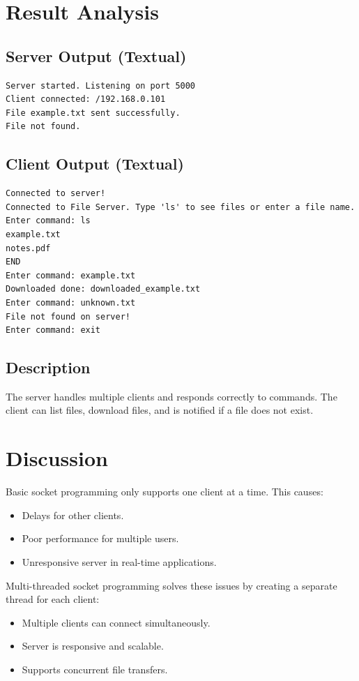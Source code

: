 \documentclass{article}
\begin{document}
\section{Result Analysis}
\subsection{Server Output (Textual)}
\begin{verbatim}
Server started. Listening on port 5000
Client connected: /192.168.0.101
File example.txt sent successfully.
File not found.
\end{verbatim}

\subsection{Client Output (Textual)}
\begin{verbatim}
Connected to server!
Connected to File Server. Type 'ls' to see files or enter a file name.
Enter command: ls
example.txt
notes.pdf
END
Enter command: example.txt
Downloaded done: downloaded_example.txt
Enter command: unknown.txt
File not found on server!
Enter command: exit
\end{verbatim}

\subsection{Description}
The server handles multiple clients and responds correctly to commands. The client can list files, download files, and is notified if a file does not exist.

\section{Discussion}
Basic socket programming only supports one client at a time. This causes:
\begin{itemize}
    \item Delays for other clients.
    \item Poor performance for multiple users.
    \item Unresponsive server in real-time applications.
\end{itemize}

Multi-threaded socket programming solves these issues by creating a separate thread for each client:
\begin{itemize}
    \item Multiple clients can connect simultaneously.
    \item Server is responsive and scalable.
    \item Supports concurrent file transfers.
\end{itemize}
\end{document}
